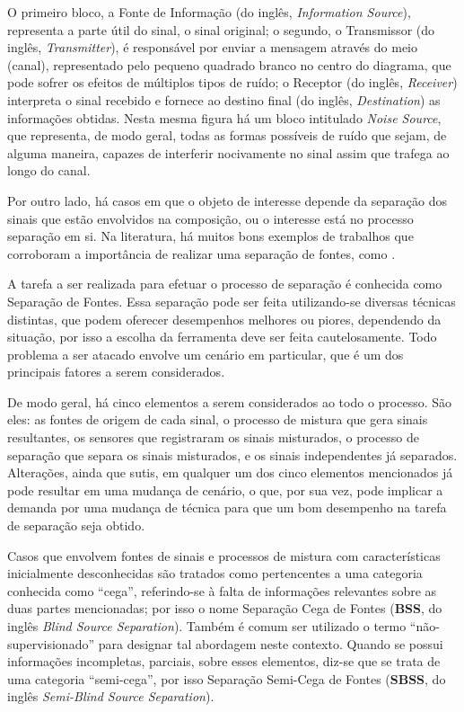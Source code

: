 O primeiro bloco, a Fonte de Informação (do inglês, \textit{Information Source}), representa a parte útil do sinal, o sinal original; o segundo, o Transmissor (do inglês, \textit{Transmitter}), é responsável por enviar a mensagem através do meio (canal), representado pelo pequeno quadrado branco no centro do diagrama, que pode sofrer os efeitos de múltiplos tipos de ruído; o Receptor (do inglês, \textit{Receiver}) interpreta o sinal recebido e fornece ao destino final (do inglês, \textit{Destination}) as informações obtidas. Nesta mesma figura há um bloco intitulado \textit{Noise Source}, que representa, de modo geral, todas as formas possíveis de ruído que sejam, de alguma maneira, capazes de interferir nocivamente no sinal assim que trafega ao longo do canal.

Por outro lado, há casos em que o objeto de interesse depende da separação dos sinais que estão envolvidos na composição, ou o interesse está no processo separação em si. Na literatura, há muitos bons exemplos de trabalhos que corroboram a importância de realizar uma separação de fontes, como \citep{belouchrani1997blind, nugraha2016multichannel}.

A tarefa a ser realizada para efetuar o processo de separação é conhecida como Separação de Fontes. Essa separação pode ser feita utilizando-se diversas técnicas distintas, que podem oferecer desempenhos melhores ou piores, dependendo da situação, por isso a escolha da ferramenta deve ser feita cautelosamente. Todo problema a ser atacado envolve um cenário em particular, que é um dos principais fatores a serem considerados.

De modo geral, há cinco elementos a serem considerados ao todo o processo. São eles: as fontes de origem de cada sinal, o processo de mistura que gera sinais resultantes, os sensores que registraram os sinais misturados, o processo de separação que separa os sinais misturados, e os sinais independentes já separados. Alterações, ainda que sutis, em qualquer um dos cinco elementos mencionados já pode resultar em uma mudança de cenário, o que, por sua vez, pode implicar a demanda por uma mudança de técnica para que um bom desempenho na tarefa de separação seja obtido.

Casos que envolvem fontes de sinais e processos de mistura com características inicialmente desconhecidas são tratados como pertencentes a uma categoria conhecida como ``cega'', referindo-se à falta de informações relevantes sobre as duas partes mencionadas; por isso o nome Separação Cega de Fontes (\textbf{BSS}, do inglês \textit{Blind Source Separation}). Também é comum ser utilizado o termo ``não-supervisionado'' para designar tal abordagem neste contexto. Quando se possui informações incompletas, parciais, sobre esses elementos, diz-se que se trata de uma categoria ``semi-cega'', por isso Separação Semi-Cega de Fontes (\textbf{SBSS}, do inglês \textit{Semi-Blind Source Separation}).

